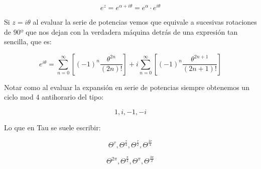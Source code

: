 \documentclass[preview]{standalone}
\begin{document}
\begin{center}
$$e^{z}=e^{\alpha+i\theta}=e^{\alpha}\cdot e^{i\theta}$$

Si $z=i \theta$ al evaluar la serie de potencias vemos que equivale a sucesivas rotaciones de $90º$  que nos dejan con la verdadera máquina detrás de una expresión tan sencilla, que es: 

$$e^{i\theta} = \sum_{n=0}^{\infty} \left[ \left(-1\right)^n \frac{\theta^{2n}}{(2n)!} \right] + i \sum_{n=0}^{\infty} \left[ \left(-1\right)^n \frac{\theta^{2n+1}}{(2n+1)!} \right]$$


Notar como al evaluar la expansión en serie de potencias siempre obtenemos un ciclo mod 4  antihorario del tipo:

$$1,i,-1,-i $$


Lo que en Tau se suele escribir:

$$\Theta^{\tau},\Theta^{\frac{\tau}{4}},\Theta^{\frac{\tau}{2}},\Theta^{\frac{3\tau}{4}}$$



$$\Theta^{2\pi},\Theta^{\frac{\pi}{2}},\Theta^{\pi},\Theta^{\frac{3\pi}{2}}$$
\end{center}
\end{document}
